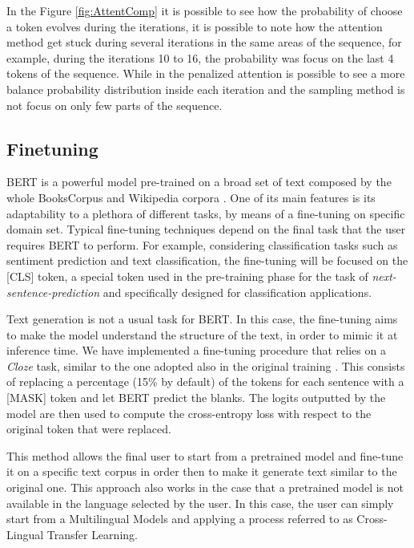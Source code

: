 \documentclass[10pt,twocolumn,letterpaper]{article}
\begin{document}
In the Figure \ref{fig:AttentComp} it is possible to see how the probability of choose a token evolves
during the iterations, it is possible to note how the attention method
get stuck during several iterations in the same areas of the sequence, for example, during the iterations
10 to 16, the probability was focus on the last 4 tokens of the sequence.
While in the penalized attention is possible to see a more balance probability distribution inside each iteration
and the sampling method is not focus on only few parts of the sequence.
\subsection{Finetuning}
BERT is a powerful model pre-trained on a broad set of text composed by the whole
BooksCorpus and Wikipedia corpora \cite{wang2019bert}.
One of its main features is its adaptability to a plethora of different tasks,
by means of a fine-tuning on specific domain set.
Typical fine-tuning techniques depend on the final task that the user requires BERT to perform.
For example, considering classification tasks such as sentiment prediction and text classification,
the fine-tuning will be focused on the [CLS] token, a special token used in the pre-training
phase for the task of \textit{next-sentence-prediction} and specifically designed for classification applications.

Text generation is not a usual task for BERT.
In this case, the fine-tuning aims to make the model understand the structure of the text,
in order to mimic it at inference time.
We have implemented a fine-tuning procedure that relies on a \textit{Cloze} task, similar to the one adopted also in the
 original training \cite{bert}.
This consists of replacing a percentage (15\% by default) of the tokens for each sentence with a [MASK] token and let
BERT predict the blanks. The logits outputted by the model are then used to compute the cross-entropy
loss with respect to the original token that were replaced.

This method allows the final user to start from a pretrained model and fine-tune it on a specific
text corpus in order then to make it generate text similar to the original one.
This approach also works in the case that a pretrained model is not available in the language selected by the user.
In this case, the user can simply start from a Multilingual Models and applying a process referred to as 
Cross-Lingual Transfer Learning\cite{crosslanguage}.
\end{document}
